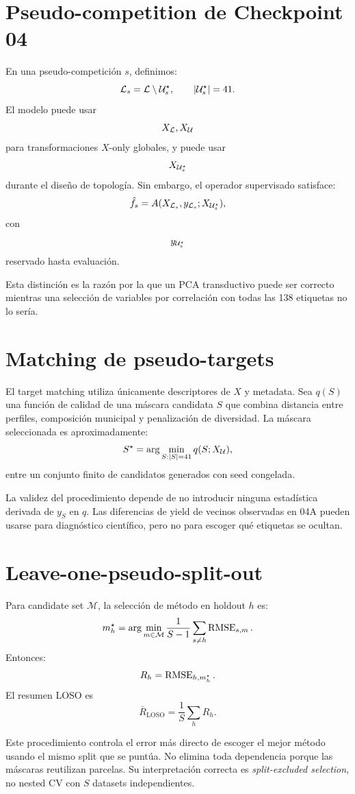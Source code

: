 \section{Pseudo-competition de Checkpoint 04}

En una pseudo-competición $s$, definimos:
\[
\mathcal{L}_s=\mathcal{L}\setminus\mathcal{U}_s^\star,
\qquad
|\mathcal{U}_s^\star|=41.
\]
El modelo puede usar
\[
X_{\mathcal{L}},X_{\mathcal{U}}
\]
para transformaciones $X$-only globales, y puede usar
\[
X_{\mathcal{U}_s^\star}
\]
durante el diseño de topología. Sin embargo, el operador supervisado satisface:
\[
\hat f_s
=
A(X_{\mathcal{L}_s},y_{\mathcal{L}_s};X_{\mathcal{U}_s^\star}),
\]
con
\[
y_{\mathcal{U}_s^\star}
\]
reservado hasta evaluación.

Esta distinción es la razón por la que un PCA transductivo puede ser correcto mientras una
selección de variables por correlación con todas las 138 etiquetas no lo sería.

\section{Matching de pseudo-targets}

El target matching utiliza únicamente descriptores de $X$ y metadata. Sea $q(S)$ una función
de calidad de una máscara candidata $S$ que combina distancia entre perfiles, composición
municipal y penalización de diversidad. La máscara seleccionada es aproximadamente:
\[
S^\star
=
\arg\min_{S:|S|=41}
q(S;X_{\mathcal{U}}),
\]
entre un conjunto finito de candidatos generados con seed congelada.

La validez del procedimiento depende de no introducir ninguna estadística derivada de
$y_S$ en $q$. Las diferencias de yield de vecinos observadas en 04A pueden usarse para
diagnóstico científico, pero no para escoger qué etiquetas se ocultan.

\section{Leave-one-pseudo-split-out}

Para candidate set $\mathcal M$, la selección de método en holdout $h$ es:
\[
m_h^\star
=
\arg\min_{m\in\mathcal M}
\frac{1}{S-1}
\sum_{s\neq h}\operatorname{RMSE}_{s,m}.
\]
Entonces:
\[
R_h
=
\operatorname{RMSE}_{h,m_h^\star}.
\]
El resumen LOSO es
\[
\bar R_{\mathrm{LOSO}}=\frac1S\sum_h R_h.
\]

Este procedimiento controla el error más directo de escoger el mejor método usando el mismo
split que se puntúa. No elimina toda dependencia porque las máscaras reutilizan parcelas. Su
interpretación correcta es \emph{split-excluded selection}, no nested CV con $S$ datasets
independientes.

